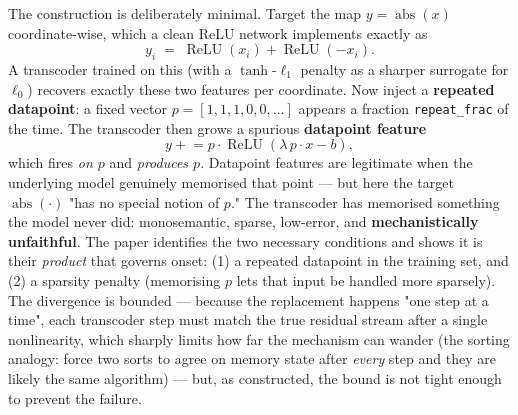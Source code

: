 The construction is deliberately minimal. Target the map $y=\operatorname{abs}(x)$ coordinate-wise, which a clean ReLU network implements exactly as
\[
y_i \;=\; \operatorname{ReLU}(x_i) + \operatorname{ReLU}(-x_i).
\]
A transcoder trained on this (with a $\tanh$-$\ell_1$ penalty as a sharper surrogate for $\ell_0$) recovers exactly these two features per coordinate. Now inject a \textbf{repeated datapoint}: a fixed vector $p=[1,1,1,0,0,\dots]$ appears a fraction \texttt{repeat\_frac} of the time. The transcoder then grows a spurious \textbf{datapoint feature}
\[
y \mathrel{+}= p\cdot\operatorname{ReLU}(\lambda\, p\!\cdot\! x - b),
\]
which fires \emph{on $p$} and \emph{produces $p$}. Datapoint features are legitimate when the underlying model genuinely memorised that point --- but here the target $\operatorname{abs}(\cdot)$ "has no special notion of $p$." The transcoder has memorised something the model never did: monosemantic, sparse, low-error, and \textbf{mechanistically unfaithful}. The paper identifies the two necessary conditions and shows it is their \emph{product} that governs onset: (1) a repeated datapoint in the training set, and (2) a sparsity penalty (memorising $p$ lets that input be handled more sparsely). The divergence is bounded --- because the replacement happens "one step at a time", each transcoder step must match the true residual stream after a single nonlinearity, which sharply limits how far the mechanism can wander (the sorting analogy: force two sorts to agree on memory state after \emph{every} step and they are likely the same algorithm) --- but, as constructed, the bound is not tight enough to prevent the failure.


